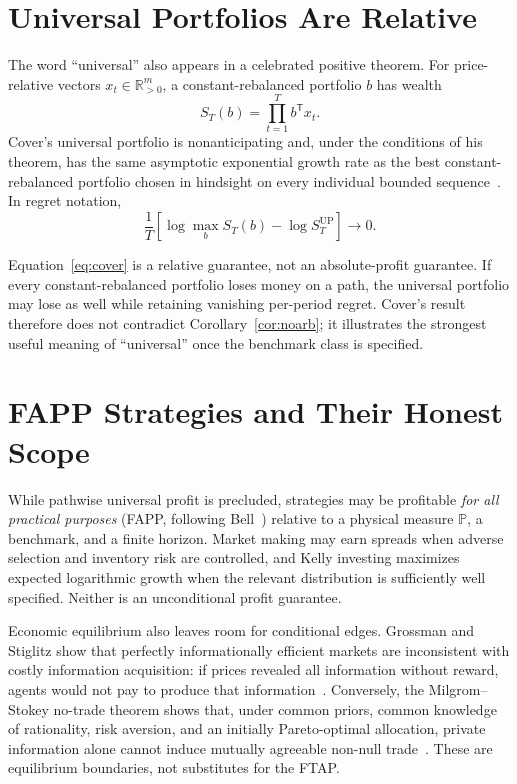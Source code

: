\documentclass[aps,pra,reprint,superscriptaddress,amsmath,amssymb]{revtex4-2}
\theoremstyle{plain}
\theoremstyle{definition}
\theoremstyle{remark}
\begin{document}
\section{Universal Portfolios Are Relative}
\label{sec:cover}

The word ``universal'' also appears in a celebrated positive theorem.
For price-relative vectors \(x_t\in\mathbb{R}_{>0}^m\), a constant-rebalanced
portfolio \(b\) has wealth
\[
  S_T(b)=\prod_{t=1}^T b^\mathsf{T}x_t.
\]
Cover's universal portfolio is nonanticipating and, under the conditions of
his theorem, has the same asymptotic exponential growth rate as the best
constant-rebalanced portfolio chosen in hindsight on every individual bounded
sequence~\cite{Cover1991}. In regret notation,
\begin{equation}
  \frac1T\left[
  \log\max_{b}S_T(b)-\log S_T^{\mathrm{UP}}
  \right]\longrightarrow0.
  \label{eq:cover}
\end{equation}

Equation~\eqref{eq:cover} is a relative guarantee, not an absolute-profit
guarantee. If every constant-rebalanced portfolio loses money on a path, the
universal portfolio may lose as well while retaining vanishing per-period
regret. Cover's result therefore does not contradict
Corollary~\ref{cor:noarb}; it illustrates the strongest useful meaning of
``universal'' once the benchmark class is specified.

\section{FAPP Strategies and Their Honest Scope}
\label{sec:fapp}

While pathwise universal profit is precluded, strategies may be profitable
\emph{for all practical purposes} (FAPP, following Bell~\cite{bell-a})
relative to a physical measure \(\mathbb{P}\), a benchmark, and a finite
horizon. Market making may earn spreads when adverse selection and inventory
risk are controlled, and Kelly investing maximizes expected logarithmic
growth when the relevant distribution is sufficiently well specified. Neither
is an unconditional profit guarantee.

Economic equilibrium also leaves room for conditional edges. Grossman and
Stiglitz show that perfectly informationally efficient markets are
inconsistent with costly information acquisition: if prices revealed all
information without reward, agents would not pay to produce that
information~\cite{GrossmanStiglitz1980}. Conversely, the Milgrom--Stokey
no-trade theorem shows that, under common priors, common knowledge of
rationality, risk aversion, and an initially Pareto-optimal allocation, private
information alone cannot induce mutually agreeable non-null
trade~\cite{MilgromStokey1982}. These are equilibrium boundaries, not
substitutes for the FTAP.
\end{document}
